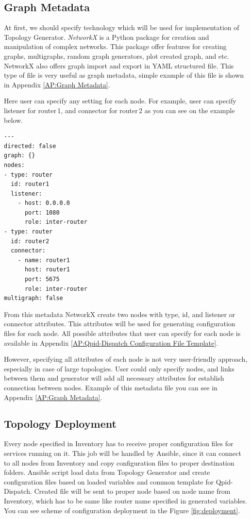 
\subsection{Graph Metadata}
\label{Graph Metadata}
At first, we should specify technology which will be used for implementation of Topology Generator. \emph{NetworkX} is a Python package for creation and manipulation of complex networks. This package offer features for creating graphs, multigraphs, random graph generators, plot created graph, and etc. NetworkX also offers graph import and export in YAML structured file. This type of file is very useful as graph metadata, simple example of this file is shown in Appendix \ref{AP:Graph Metadata}.

Here user can specify any setting for each node. For example, user can specify listener for router\,1, and connector for router\,2 as you can see on the example below.

\begin{verbatim}
---
directed: false
graph: {}
nodes:
- type: router
  id: router1
  listener:
  	- host: 0.0.0.0
  	  port: 1080
  	  role: inter-router
- type: router
  id: router2
  connector:
  	- name: router1
  	  host: router1
  	  port: 5675
  	  role: inter-router
multigraph: false
\end{verbatim}
From this metadata NetworkX create two nodes with type, id, and listener or connector attributes. This attributes will be used for generating configuration files for each node. All possible attributes that user can specify for each node is available in Appendix \ref{AP:Qpid-Dispatch Configuration File Template}.

However, specifying all attributes of each node is not very user-friendly approach, especially in case of large topologies. User could only specify nodes, and links between them and generator will add all necessary attributes for establish connection between nodes. Example of this metadata file you can see in Appendix \ref{AP:Graph Metadata}.

\subsection{Topology Deployment}
Every node specified in Inventory has to receive proper configuration files for services running on it. This job will be handled by Ansible, since it can connect to all nodes from Inventory and copy configuration files to proper destination folders. Ansible script load data from Topology Generator and create configuration files based on loaded variables and common template for Qpid-Dispatch. Created file will be sent to proper node based on node name from Inventory, which has to be same like router name specified in generated variables. You can see scheme of configuration deployment in the Figure \ref{fig:deployment}.

